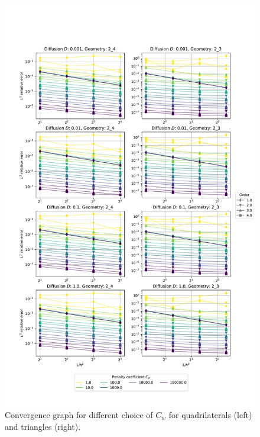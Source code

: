 \begin{figure}[p!]
	\centering
	\includegraphics[height=\textheight]{../figs/parametric/diffusion_2D/laplace}
		
	\caption{ Convergence graph for different choice of $C_w$  for 
		quadrilaterals (left) and triangles (right).}
	\label{fig:conv_laplace}
\end{figure}